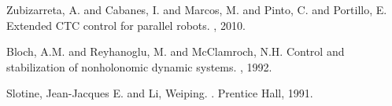 \begin{thebibliography}{10}
Zubizarreta, A. and Cabanes, I. and Marcos, M. and Pinto, C. and Portillo, E.
\newblock Extended CTC control for parallel robots.
, 2010.

Bloch, A.M. and Reyhanoglu, M. and McClamroch, N.H.
\newblock Control and stabilization of nonholonomic dynamic systems.
, 1992.

Slotine, Jean-Jacques E. and Li, Weiping.
.
\newblock Prentice Hall, 1991.


\end{thebibliography}
